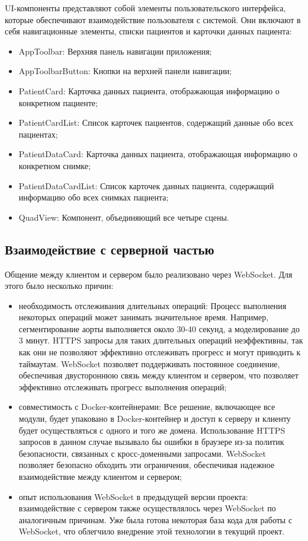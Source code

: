 UI-компоненты представляют собой элементы пользовательского интерфейса, которые обеспечивают взаимодействие пользователя с системой. Они включают в себя навигационные элементы, списки пациентов и карточки данных пациента:
\begin{itemize}
    \item AppToolbar: Верхняя панель навигации приложения;
    \item AppToolbarButton: Кнопки на верхней панели навигации;
    \item PatientCard: Карточка данных пациента, отображающая информацию о конкретном пациенте;
    \item PatientCardList: Список карточек пациентов, содержащий данные обо всех пациентах;
    \item PatientDataCard: Карточка данных пациента, отображающая информацию о конкретном снимке;
    \item PatientDataCardList: Список карточек данных пациента, содержащий информацию обо всех снимках пациента;
    \item QuadView: Компонент, объединяющий все четыре сцены.
\end{itemize}

\subsection{Взаимодействие с серверной частью}

Общение между клиентом и сервером было реализовано через WebSocket. Для этого было несколько причин:

\begin{itemize}
    \item необходимость отслеживания длительных операций: Процесс выполнения некоторых операций может занимать значительное время. Например, сегментирование аорты выполняется около 30-40 секунд, а моделирование до 3 минут. HTTPS запросы для таких длительных операций неэффективны, так как они не позволяют эффективно отслеживать прогресс и могут приводить к таймаутам. WebSocket позволяет поддерживать постоянное соединение, обеспечивая двустороннюю связь между клиентом и сервером, что позволяет эффективно отслеживать прогресс выполнения операций;
    \item совместимость с Docker-контейнерами: Все решение, включающее все модули, будет упаковано в Docker-контейнер и доступ к серверу и клиенту будет осуществляться с одного и того же домена. Использование HTTPS запросов в данном случае вызывало бы ошибки в браузере из-за политик безопасности, связанных с кросс-доменными запросами. WebSocket позволяет безопасно обходить эти ограничения, обеспечивая надежное взаимодействие между клиентом и сервером;
    \item опыт использования WebSocket в предыдущей версии проекта: взаимодействие с сервером также осуществлялось через WebSocket по аналогичным причинам. Уже была готова некоторая база кода для работы с WebSocket, что облегчило внедрение этой технологии в текущий проект.
\end{itemize}


